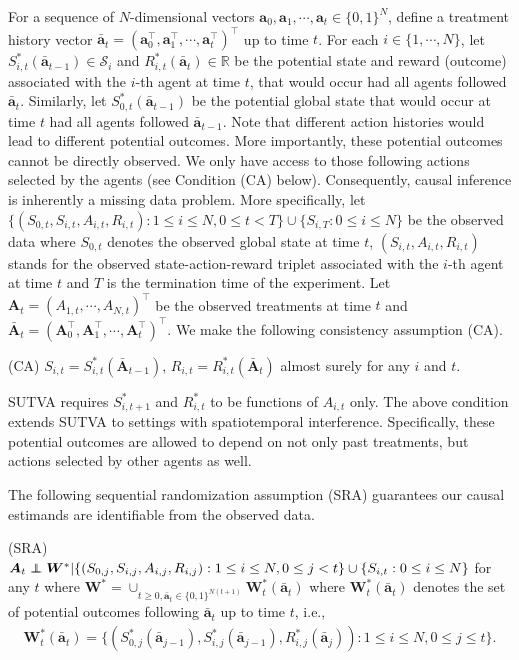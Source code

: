 \documentclass{article}
\newcommand\independent{\protect\mathpalette{\protect\independenT}{\perp}}
\def\independenT#1#2{\mathrel{\rlap{$#1#2$}\mkern2mu{#1#2}}}
\begin{document}
For a sequence of $N$-dimensional vectors $\bm{a}_0,\bm{a}_1,\cdots, \bm{a}_t\in \{0,1\}^{N}$, define a treatment history vector $\bar{\bm{a}}_t=(\bm{a}_0^\top,\bm{a}_1^\top,\cdots,\bm{a}_t^\top)^\top$ up to time $t$. For each $i\in \{1,\cdots,N\}$, let $S_{i,t}^*(\bar{\bm{a}}_{t-1}) \in \mathcal{S}_i$ and $R_{i,t}^*(\bar{\bm{a}}_t)\in \mathbb{R}$ be the potential state and reward (outcome) associated with the $i$-th agent at time $t$, that would occur had all agents followed $\bar{\bm{a}}_t$. Similarly, let $S_{0,t}^*(\bar{\bm{a}}_{t-1})$ be the potential global state that would occur at time $t$ had all agents followed $\bar{\bm{a}}_{t-1}$. Note that different action histories would lead to different potential outcomes. More importantly, these potential outcomes cannot be directly observed. We only have access to those following actions selected by the agents (see Condition (CA) below). Consequently, causal inference is inherently a missing data problem. More specifically, let $\{(S_{0,t}, S_{i,t},A_{i,t},R_{i,t}):1\le i\le N,0\le t< T\}\cup \{S_{i,T}:0\le i\le N\}$ be the observed data where $S_{0,t}$ denotes the observed global state at time $t$, $(S_{i,t},A_{i,t},R_{i,t})$ stands for the observed state-action-reward triplet associated with the $i$-th agent at time $t$ and $T$ is the termination time of the experiment. 
Let $\bm{A}_t=(A_{1,t},\cdots,A_{N,t})^\top$ be the observed treatments at time $t$ and $\bar{\bm{A}}_t=(\bm{A}_0^\top,\bm{A}_1^\top,\cdots,\bm{A}_t^\top)^\top$. We make the following consistency assumption (CA).

(CA) $S_{i,t}=S_{i,t}^*(\bar{\bm{A}}_{t-1})$, $R_{i,t}=R_{i,t}^*(\bar{\bm{A}}_t)$ almost surely for any $i$ and $t$.

SUTVA requires $S_{i,t+1}^*$ and $R_{i,t}^*$ to be functions of $A_{i,t}$ only. The above condition extends SUTVA to settings with spatiotemporal interference. Specifically, these potential outcomes are allowed to depend on not only past treatments, but actions selected by other agents as well. 

The following sequential randomization assumption (SRA) guarantees our causal estimands are identifiable from the observed data. 

(SRA) $\bm{A}_t \independent \bm{W}^* |\{(S_{0,j},S_{i,j},A_{i,j},R_{i,j}): 1\le i\le N, 0\le j<t \}\cup \{S_{i,t}:0\le i\le N\}$ for any $t$ where $\bm{W}^*=\cup_{t\ge 0,\bar{\bm{a}}_t\in \{0,1\}^{N(t+1)} } \bm{W}_t^*(\bar{\bm{a}}_t)$ where $\bm{W}_t^*(\bar{\bm{a}}_t)$ denotes the set of potential outcomes following $\bar{\bm{a}}_t$ up to time $t$, i.e.,
\vspace*{-0.1cm}
\begin{eqnarray*}
	\bm{W}_t^*(\bar{\bm{a}}_t)=\{ (S_{0,j}^*(\bar{\bm{a}}_{j-1}), S_{i,j}^*(\bar{\bm{a}}_{j-1}), R_{i,j}^*(\bar{\bm{a}}_j)):1\le i\le N, 0\le j\le t \}.
\end{eqnarray*}
\end{document}
